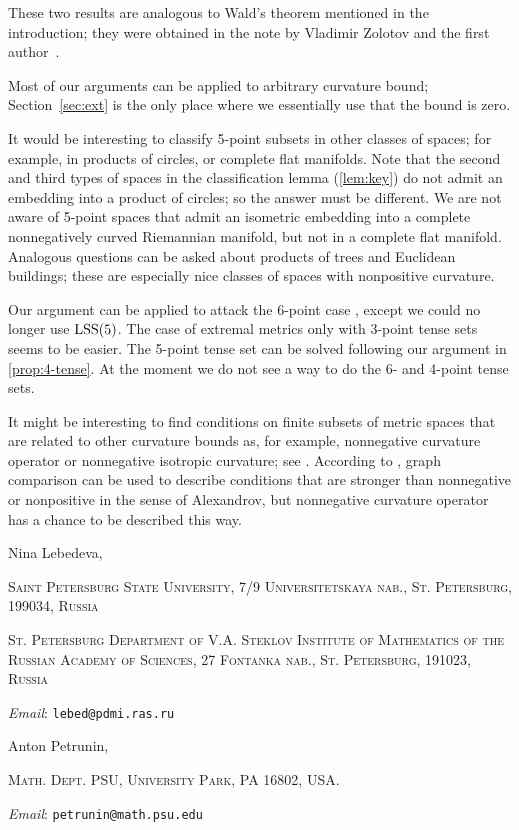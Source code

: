 \documentclass{article}
\makeatletter
\newcommand{\Addresses}{{\bigskip\footnotesize

\noindent Nina Lebedeva,
\par\nopagebreak
 \textsc{Saint Petersburg State University, 7/9 Universitetskaya nab., St. Petersburg, 199034, Russia}
\par
\nopagebreak
 \textsc{St. Petersburg Department of V.A. Steklov Institute of Mathematics of the Russian Academy of Sciences, 27 Fontanka nab., St. Petersburg, 191023, Russia}
  \par\nopagebreak
  \textit{Email}: \texttt{lebed@pdmi.ras.ru}

\medskip

\noindent   Anton Petrunin, 
\par\nopagebreak
 \textsc{Math. Dept. PSU, University Park, PA 16802, USA.}
  \par\nopagebreak
  \textit{Email}: \texttt{petrunin@math.psu.edu}
  
}}
\makeatother
\begin{document}
These two results are analogous to Wald's theorem mentioned in the introduction;
they were obtained in the note by Vladimir Zolotov and the first author~\cite{lebedeva-zolotov}.

\medskip

Most of our arguments can be applied to arbitrary curvature bound;
Section~\ref{sec:ext} is the only place where we essentially use that the bound is zero.

It would be interesting to classify 5-point subsets in other classes of spaces;
for example, in products of circles, or complete flat manifolds.
Note that the second and third types of spaces in the classification lemma (\ref{lem:key}) do not admit an embedding into a product of circles; so the answer must be different.
We are not aware of 5-point spaces that admit an isometric embedding into a complete nonnegatively curved Riemannian manifold, but not in a complete flat manifold.
Analogous questions can be asked about products of trees \cite{lebedeva-petrunin-octahedron} and Euclidean buildings;
these are especially nice classes of spaces with nonpositive curvature.

Our argument can be applied to attack the 6-point case \cite[Question~6.3]{lebedeva-petrunin}, except we could no longer use $\mathrm{LSS}(5)$.
The case of extremal metrics only with 3-point tense sets seems to be easier. 
The 5-point tense set can be solved following our argument in \ref{prop:4-tense}.
At the moment we do not see a way to do the 6- and 4-point tense sets.

It might be interesting to find conditions on finite subsets of metric spaces that are related to other curvature bounds as, for example, nonnegative curvature operator or nonnegative isotropic curvature; see \cite[1.19$_+(e)$]{gromov}.
According to \cite{lebedeva-petrunin-graph-alex}, graph comparison can be used to describe conditions that are stronger than nonnegative or nonpositive in the sense of Alexandrov, but nonnegative curvature operator has a chance to be described this way.



{\sloppy
\printbibliography[heading=bibintoc]
\fussy
}

\Addresses
\end{document}
